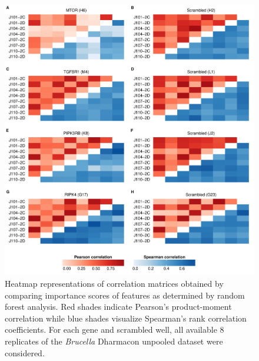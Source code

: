 \begin{knitrout}
\color{fgcolor}\begin{figure}

{\centering \includegraphics[width=\maxwidth]{figures/R/forest-corr-forest-corr-1} 

}

\caption[Heatmap representations of Pearson and Spearman correlation among feature importance scores obtained by random forest analysis.]{Heatmap representations of correlation matrices obtained by comparing importance scores of features as determined by random forest analysis. Red shades indicate Pearson's product-moment correlation while blue shades visualize Spearman's rank correlation coefficients. For each gene and scrambled well, all available 8 replicates of the \textit{Brucella} Dharmacon unpooled dataset were considered.}\label{fig:forest-corr}
\end{figure}


\end{knitrout}

